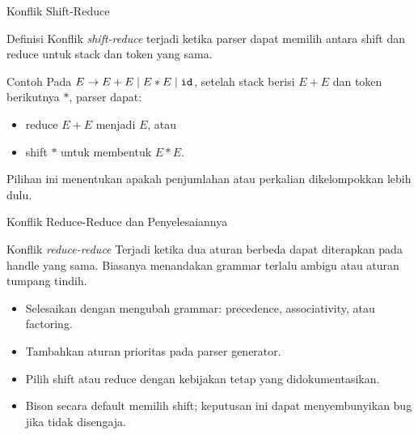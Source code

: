 \documentclass[aspectratio=169,10pt,t]{beamer}
\begin{document}
\begin{frame}{Konflik Shift-Reduce}
  \begin{block}{Definisi}
    \small
    Konflik \textit{shift-reduce} terjadi ketika parser dapat memilih
    antara shift dan reduce untuk stack dan token yang sama.
  \end{block}

  \begin{exampleblock}{Contoh}
    \footnotesize
    Pada \(E \to E+E \mid E*E \mid \texttt{id}\), setelah stack berisi
    \(E+E\) dan token berikutnya \(*\), parser dapat:
    \begin{itemize}
      \item reduce \(E+E\) menjadi \(E\), atau
      \item shift \(*\) untuk membentuk \(E*E\).
    \end{itemize}
    Pilihan ini menentukan apakah penjumlahan atau perkalian
    dikelompokkan lebih dulu.
  \end{exampleblock}
\end{frame}

\begin{frame}{Konflik Reduce-Reduce dan Penyelesaiannya}
  \begin{block}{Konflik \textit{reduce-reduce}}
    \small
    Terjadi ketika dua aturan berbeda dapat diterapkan pada handle yang
    sama. Biasanya menandakan grammar terlalu ambigu atau aturan
    tumpang tindih.
  \end{block}

  \begin{itemize}
    \item Selesaikan dengan mengubah grammar: precedence,
          associativity, atau factoring.
    \item Tambahkan aturan prioritas pada parser generator.
    \item Pilih shift atau reduce dengan kebijakan tetap yang
          didokumentasikan.
    \item Bison secara default memilih shift; keputusan ini dapat
          menyembunyikan bug jika tidak disengaja.
  \end{itemize}
\end{frame}
\end{document}
